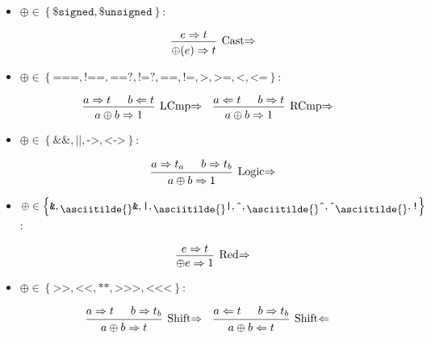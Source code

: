 \documentclass{article}
\newcommand{\mytilde}{\raisebox{-.7ex}{\asciitilde{}}}
\newcommand{\cast}{\ensuremath{\left\{\texttt{\$signed}, \texttt{\$unsigned}\right\}}}
\newcommand{\comp}{\ensuremath{\left\{
      \texttt{===}, \texttt{!==}, \texttt{==?}, \texttt{!=?}, \texttt{==},
      \texttt{!=}, \texttt{>}, \texttt{>=}, \texttt{<}, \texttt{<=}
    \right\}}}
\newcommand{\logic}{\ensuremath{\left\{\texttt{\&\&}, \texttt{||}, \texttt{->}, \texttt{<->}\right\}}}
\newcommand{\red}{\ensuremath{\left\{
      \texttt{\&}, \mytilde\texttt{\&}, \texttt{|}, \mytilde\texttt{|}, \texttt{\^{}},
      \mytilde\texttt{\^{}}, \texttt{\^{}}\mytilde, \texttt{!}
    \right\}}}
\newcommand{\shift}{\ensuremath{\left\{
      \texttt{>>}, \texttt{<}\texttt{<}, \texttt{**}, \texttt{>>>},
      \texttt{<}\texttt{<}\texttt{<}
    \right\}}}
\renewcommand{\S}{\ensuremath{\Rightarrow}}
\newcommand{\C}{\ensuremath{\Leftarrow}}
\newcommand{\s}[2]{#1 \S{} #2}
\renewcommand{\c}[2]{#1 \C{} #2}
\begin{document}
\begin{itemize}[leftmargin=*]
    \item $\oplus \in \cast$:

          \begin{equation*}
              \begin{prooftree}
                  \hypo{\s{e}{t}}
                  \infer1[Cast\S]{\s{\oplus(e)}{t}}
              \end{prooftree}
          \end{equation*}

    \item $\oplus \in \comp$:

          \begin{align*}
               &
              \begin{prooftree}
                  \hypo{\s{a}{t}}
                  \hypo{\c{b}{t}}
                  \infer2[LCmp\S]{\s{a \oplus b}{1}}
              \end{prooftree}
               &
               &
              \begin{prooftree}
                  \hypo{\c{a}{t}}
                  \hypo{\s{b}{t}}
                  \infer2[RCmp\S]{\s{a \oplus b}{1}}
              \end{prooftree}
          \end{align*}

    \item $\oplus \in \logic$:

          \begin{equation*}
              \begin{prooftree}
                  \hypo{\s{a}{t_a}}
                  \hypo{\s{b}{t_b}}
                  \infer2[Logic\S]{\s{a \oplus b}{1}}
              \end{prooftree}
          \end{equation*}

    \item $\oplus \in \red$:

          \begin{equation*}
              \begin{prooftree}
                  \hypo{\s{e}{t}}
                  \infer1[Red\S]{\s{\oplus e}{1}}
              \end{prooftree}
          \end{equation*}


    \item $\oplus \in \shift$:

          \begin{align*}
               &
              \begin{prooftree}
                  \hypo{\s{a}{t}}
                  \hypo{\s{b}{t_b}}
                  \infer2[Shift\S]{\s{a \oplus b}{t}}
              \end{prooftree}
               &
               &
              \begin{prooftree}
                  \hypo{\c{a}{t}}
                  \hypo{\s{b}{t_b}}
                  \infer2[Shift\C]{\c{a \oplus b}{t}}
              \end{prooftree}
          \end{align*}


\end{itemize}
\end{document}
